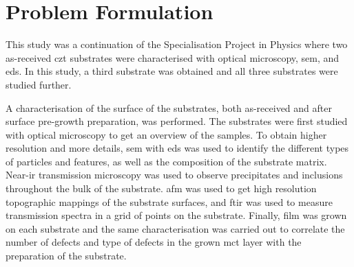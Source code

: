 \section{Problem Formulation}%

This study was a continuation of the Specialisation Project in Physics where two as-received \ac{czt} substrates were characterised with optical microscopy, \ac{sem}, and \ac{eds}. In this study, a third substrate was obtained and all three substrates were studied further. 

A characterisation of the surface of the substrates, both as-received and after surface pre-growth preparation, was performed. The substrates were first studied with optical microscopy to get an overview of the samples. To obtain higher resolution and more details, \ac{sem} with \ac{eds} was used to identify the different types of particles and features, as well as the composition of the substrate matrix. Near-\ac{ir} transmission microscopy was used to observe precipitates and inclusions throughout the bulk of the substrate. \Ac{afm} was used to get high resolution topographic mappings of the substrate surfaces, and \ac{ftir} was used to measure transmission spectra in a grid of points on the substrate. Finally,  film was grown on each substrate and the same characterisation was carried out to correlate the number of defects and type of defects in the grown \ac{mct} layer with the preparation of the substrate.

